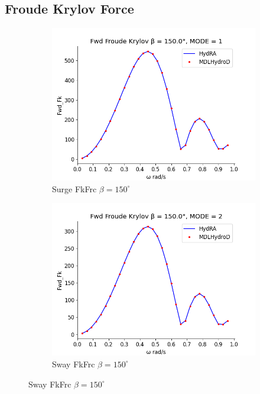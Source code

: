 \subsection{Froude Krylov Force}
\begin{figure}[H]
    \centering
    \begin{subfigure}[b]{0.49\textwidth}
        \includegraphics[width=\textwidth]{plots/kcs/fk/fk1.png}
        \caption{Surge FkFrc $\beta = 150^{\circ}$}
    \end{subfigure}
    \begin{subfigure}[b]{0.49\textwidth}
        \includegraphics[width=\textwidth]{plots/kcs/fk/fk2.png}
        \caption{Sway FkFrc $\beta = 150^{\circ}$}
    \end{subfigure}

\end{figure}
